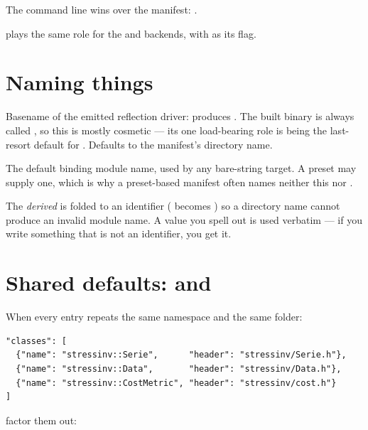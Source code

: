 The command line wins over the manifest:
.

 plays the same role for the  and  backends,
with  as its flag.

\section{Naming things}

\begin{description}[leftmargin=0cm,style=nextline,font=\normalfont\code]
  \item[generator\_name] Basename of the emitted reflection driver:
     produces . The built
    binary is always called , so this is mostly cosmetic --- its
    one load-bearing role is being the last-resort default for
    . Defaults to the manifest's directory name.
  \item[module\_name] The default binding module name, used by any bare-string
    target. A preset may supply one, which is why a preset-based manifest often
    names neither this nor .
\end{description}

\begin{note}
The \emph{derived}  is folded to an identifier
( becomes ) so a directory name cannot
produce an invalid module name. A value you spell out is used verbatim ---
if you write something that is not an identifier, you get it.
\end{note}

\section{Shared defaults:  and }
\label{sec:shared-defaults}

When every entry repeats the same namespace and the same folder:

\begin{lstlisting}[style=json]
"classes": [
  {"name": "stressinv::Serie",      "header": "stressinv/Serie.h"},
  {"name": "stressinv::Data",       "header": "stressinv/Data.h"},
  {"name": "stressinv::CostMetric", "header": "stressinv/cost.h"}
]
\end{lstlisting}

factor them out:

